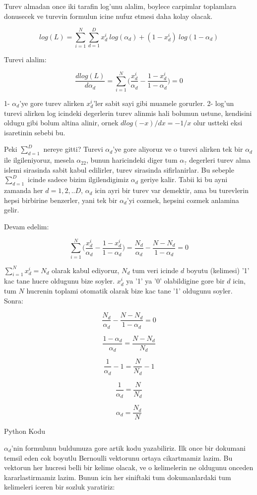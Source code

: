 \documentclass[12pt,fleqn]{article}\usepackage{../common}
\begin{document}
Turev almadan once iki tarafin log'unu alalim, boylece carpimlar toplamlara
donusecek ve turevin formulun icine nufuz etmesi daha kolay olacak.

$$ log(L) = \sum_{i=1}^N \sum_{d=1}^{D} {x_d^i}\ log (\alpha_d) + 
(1-x_d^i)\ log (1-\alpha_d) $$

Turevi alalim:

$$ \frac{dlog(L)}{d\alpha_d} = \sum_{i=1}^N \bigg( \frac{x_d^i}{\alpha_d} -
\frac{1-x_d^i}{1-\alpha_d} \bigg) = 0
 $$

1- $\alpha_d$'ye gore turev alirken $x_d^i$'ler sabit sayi gibi muamele
gorurler. 2- log'un turevi alirken log icindeki degerlerin turev alinmis hali
bolumun ustune, kendisini oldugu gibi bolum altina alinir, ornek 
$dlog(-x)/dx = -1/x$ olur ustteki eksi isaretinin sebebi bu. 

Peki $\sum_{d=1}^{D}$ nereye gitti? Turevi $\alpha_d$'ye gore aliyoruz ve o
turevi alirken tek bir $\alpha_d$ ile ilgileniyoruz, mesela $\alpha_{22}$,
bunun haricindeki diger tum $\alpha_?$ degerleri turev alma islemi
sirasinda sabit kabul edilirler, turev sirasinda sifirlanirlar. Bu sebeple
$\sum_{d=1}^{D}$ icinde sadece bizim ilgilendigimiz $\alpha_d$ geriye
kalir. Tabii ki bu ayni zamanda her $d=1,2,..D$, $\alpha_d$ icin ayri bir
turev var demektir, ama bu turevlerin hepsi birbirine benzerler, yani tek
bir $\alpha_d$'yi cozmek, hepsini cozmek anlamina gelir.

Devam edelim:

$$ \sum_{i=1}^N \bigg( \frac{x_d^i}{\alpha_d} - \frac{1-x_d^i}{1-\alpha_d} \bigg) =
\frac{N_d}{\alpha_d} - \frac{N-N_d}{1-\alpha_d} = 0
 $$

$\sum_{i=1}^N x_d^i = N_d$ olarak kabul ediyoruz, $N_d$ tum veri icinde $d$
boyutu (kelimesi) '1' kac tane hucre oldugunu bize soyler. $x_d^i$ ya '1' ya '0'
olabildigine gore bir $d$ icin, tum $N$ hucrenin toplami otomatik olarak bize
kac tane '1' oldugunu soyler. Sonra:

$$ \frac{N_d}{\alpha_d} - \frac{N-N_d}{1-\alpha_d} = 0  $$

$$ \frac{1-\alpha_d}{\alpha_d} = \frac{N-N_d}{N_d}   $$

$$ \frac{1}{\alpha_d} - 1 = \frac{N}{N_d} - 1  $$

$$ \frac{1}{\alpha_d} = \frac{N}{N_d}  $$

$$ \alpha_d = \frac{N_d}{N}  $$

Python Kodu

$\alpha_d$'nin formulunu buldumuza gore artik kodu yazabiliriz. Ilk once bir
dokumani temsil eden cok boyutlu Bernoulli vektorunu ortaya cikartmamiz
lazim. Bu vektorun her hucresi belli bir kelime olacak, ve o kelimelerin ne
oldugunu onceden kararlastirmamiz lazim. Bunun icin her siniftaki tum
dokumanlardaki tum kelimeleri iceren bir sozluk yaratiriz:
\end{document}
